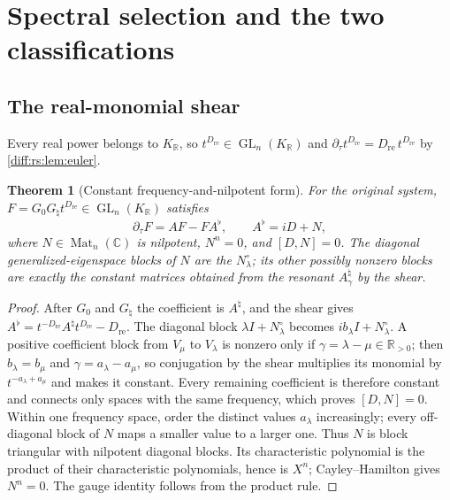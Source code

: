 \documentclass[11pt,letterpaper]{article}
\numberwithin{equation}{section}
\newtheorem{theorem}{Theorem}[section]
\theoremstyle{definition}
\theoremstyle{remark}
\newcommand{\R}{\mathbb R}
\newcommand{\C}{\mathbb C}
\newcommand{\der}{\partial}
\newcommand{\Mat}{\operatorname{Mat}}
\newcommand{\GL}{\operatorname{GL}}
\newcommand{\derT}{\der_{\tau}}
\newcommand{\KR}{K_{\R}}
\begin{document}
\section{Spectral selection and the two classifications}
\label{diff:rs:sec:selection}

\subsection{The real-monomial shear}
\label{diff:rs:sub:shear}

Every real power belongs to $\KR$, so $t^{D_{\mathrm{re}}}\in\GL_{n}(\KR)$ and
$\derT t^{D_{\mathrm{re}}}=D_{\mathrm{re}}\,t^{D_{\mathrm{re}}}$ by
\cref{diff:rs:lem:euler}.

\begin{theorem}[Constant frequency-and-nilpotent form]
\label{diff:rs:thm:constantform}
For the original system, $F=G_{0}G_{\natural}t^{D_{\mathrm{re}}}\in\GL_{n}(\KR)$
satisfies
\begin{equation}\label{diff:rs:eq:Fidentity}
 \derT F=AF-FA^{\flat},
 \qquad A^{\flat}=iD+N,
\end{equation}
where $N\in\Mat_{n}(\C)$ is nilpotent, $N^{n}=0$, and $[D,N]=0$. The diagonal
generalized-eigenspace blocks of $N$ are the $N^{\circ}_{\lambda}$; its other
possibly nonzero blocks are exactly the constant matrices obtained from the
resonant $A^{\natural}_{\gamma}$ by the shear.
\end{theorem}
\begin{proof}
After $G_{0}$ and $G_{\natural}$ the coefficient is $A^{\natural}$, and the
shear gives
$A^{\flat}=t^{-D_{\mathrm{re}}}A^{\natural}t^{D_{\mathrm{re}}}-D_{\mathrm{re}}$.
The diagonal block $\lambda I+N^{\circ}_{\lambda}$ becomes
$ib_{\lambda}I+N^{\circ}_{\lambda}$. A positive coefficient block from
$V_{\mu}$ to $V_{\lambda}$ is nonzero only if
$\gamma=\lambda-\mu\in\R_{>0}$; then $b_{\lambda}=b_{\mu}$ and
$\gamma=a_{\lambda}-a_{\mu}$, so conjugation by the shear multiplies its
monomial by $t^{-a_{\lambda}+a_{\mu}}$ and makes it constant. Every remaining
coefficient is therefore constant and connects only spaces with the same
frequency, which proves $[D,N]=0$. Within one frequency space, order the
distinct values $a_{\lambda}$ increasingly; every off-diagonal block of $N$
maps a smaller value to a larger one. Thus $N$ is block triangular
with nilpotent diagonal blocks. Its characteristic polynomial is the
product of their characteristic polynomials, hence is $X^{n}$;
Cayley--Hamilton gives $N^{n}=0$. The gauge identity follows from the
product rule.
\end{proof}
\end{document}
